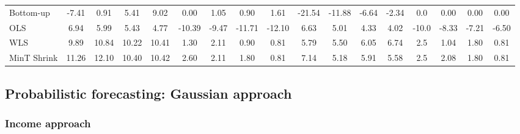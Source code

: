 \documentclass[graybox]{svmult}
\begin{document}
\begin{table}[H]
{\begin{tabular}{@{}lSSSSSSSSSSSSSSSS@{}}
			Bottom-up & -7.41 & 0.91 & 5.41 & 9.02 & 0.00 & 1.05 & 0.90 & 1.61 & -21.54 & -11.88 & -6.64 & -2.34 & 0.0 & 0.00 & 0.00 & 0.00\\
			
			OLS & 6.94 & 5.99 & 5.43 & 4.77 & -10.39 & -9.47 & -11.71 & -12.10 & 6.63 & 5.01 & 4.33 & 4.02 & -10.0 & -8.33 & -7.21 & -6.50\\
			
			WLS & 9.89 & 10.84 & 10.22 & 10.41 & 1.30 & 2.11 & 0.90 & 0.81 & 5.79 & 5.50 & 6.05 & 6.74 & 2.5 & 1.04 & 1.80 & 0.81\\
			
			MinT Shrink & 11.26 & 12.10 & 10.40 & 10.42 & 2.60 & 2.11 & 1.80 & 0.81 & 7.14 & 5.18 & 5.91 & 5.58 & 2.5 & 2.08 & 1.80 & 0.81\\
			\bottomrule
		\end{tabular}
	}
\end{table}


\subsection{Probabilistic forecasting: Gaussian approach}

\subsubsection{Income approach}
\end{document}
